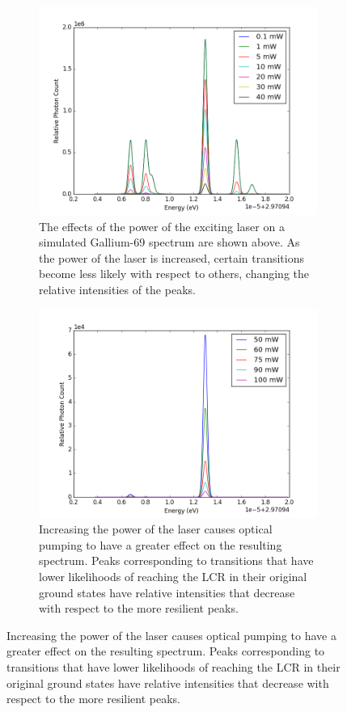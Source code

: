 \begin{figure}[h!]
\begin{center}
\begin{subfigure}{0.75\textwidth}
\includegraphics[width = \textwidth]{Graphics/Power_comparison(1-40).png}
\caption[The effects of the power of the exciting laser on a simulated Gallium-69 spectrum.]{\small The effects of the power of the exciting laser on a simulated Gallium-69 spectrum are shown above. As the power of the laser is increased, certain transitions become less likely with respect to others, changing the relative intensities of the peaks. }
\label{power1-40}
\end{subfigure}

\begin{subfigure}{0.75\textwidth}
\includegraphics[width = \textwidth]{Graphics/Power_comparison(50-100).png}
\caption[Continuation of Fig \ref{power1-40}]{\small Increasing the power of the laser causes optical pumping to have a greater effect on the resulting spectrum. Peaks corresponding to transitions that have lower likelihoods of reaching the LCR in their original ground states have relative intensities that decrease with respect to the more resilient peaks. }
\label{power50-100}
\end{subfigure}
\end{center}
\end{figure}

